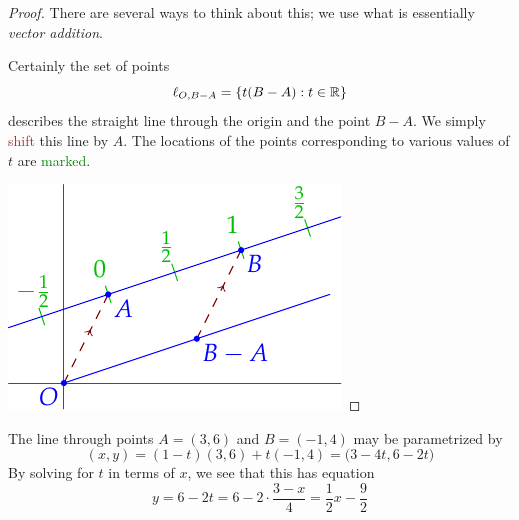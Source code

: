 \begin{proof}
There are several ways to think about this; we use what is essentially \emph{vector addition}.\par
\begin{minipage}[t]{0.6\linewidth}\vspace{-5pt}
Certainly the set of points
\[\ell_{O,B-A}=\{t(B-A):t\in\mathbb{R}\}\]
describes the straight line through the origin and the point $B-A$. We simply \textcolor{Brown}{shift} this line by $A$.\smallbreak
The locations of the points corresponding to various values of $t$ are \textcolor{Green}{marked}.
\end{minipage}\hfill\begin{minipage}[t]{0.39\linewidth}\vspace{0pt}
\flushright\includegraphics{line-line2}
\end{minipage}
\end{proof}

\begin{example}{}{}
The line through points $A=(3,6)$ and $B=(-1,4)$ may be parametrized by
\[(x,y)=(1-t)(3,6)+t(-1,4)=\bigl(3-4t,6-2t\bigr)\]
By solving for $t$ in terms of $x$, we see that this has equation
\[y=6-2t=6-2\cdot\frac{3-x}{4} =\frac 12x-\frac 92\]
\end{example}

\goodbreak

